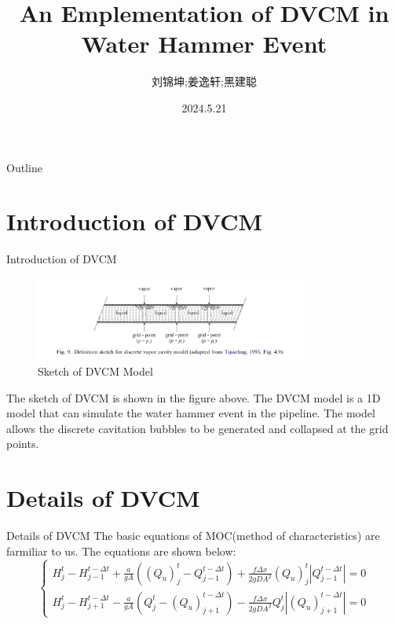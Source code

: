 \documentclass[UTF8]{ctexbeamer}
\title{An Emplementation of DVCM in Water Hammer Event}
\author{刘锦坤;姜逸轩;黑建聪}
\date{2024.5.21}
\begin{document}
\begin{frame}
    \titlepage
\end{frame}

\begin{frame}{Outline}
    \tableofcontents
\end{frame}

\section{Introduction of DVCM}

\begin{frame}{Introduction of DVCM}
    \begin{figure}
        \centering
        \includegraphics[width=0.8\textwidth]{pic/DVCM_Model.png}
        \caption{Sketch of DVCM Model}
    \end{figure}
    The sketch of DVCM is shown in the figure above. The DVCM model is a 1D model that can simulate the water hammer event in the pipeline. The model allows the discrete cavitation bubbles to be generated and collapsed at the grid points.
\end{frame}

\section{Details of DVCM}

\begin{frame}{Details of DVCM}
    The basic equations of MOC(method of characteristics) are farmiliar to us. The equations are shown below:
    \begin{equation}
        \begin{cases}
            H^t_j-H^{t-\Delta t}_{j-1}+\frac{a}{gA}({(Q_u)}^t_j-Q^{t-\Delta t}_{j-1})+\frac{f\Delta x}{2 g D A^2}{(Q_u)}^t_j|Q^{t-\Delta t}_{j-1}|=0\\
            H^t_j-H^{t-\Delta t}_{j+1}-\frac{a}{gA}(Q^t_j-{(Q_u)}^{t-\Delta t}_{j+1})-\frac{f\Delta x}{2 g D A^2}Q^t_j|{(Q_u)}^{t-\Delta t}_{j+1}|=0
        \end{cases}
    \end{equation}
\end{frame}
\end{document}
